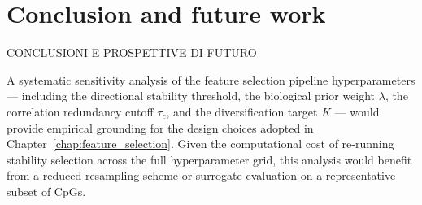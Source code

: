 \chapter{Conclusion and future work}
\label{chap:conclusion_future_work}

CONCLUSIONI E PROSPETTIVE DI FUTURO

A systematic sensitivity analysis of the feature selection 
pipeline hyperparameters — including the directional 
stability threshold, the biological prior weight $\lambda$, 
the correlation redundancy cutoff $\tau_c$, and the 
diversification target $K$ — would provide empirical 
grounding for the design choices adopted in 
Chapter~\ref{chap:feature_selection}. Given the 
computational cost of re-running stability selection 
across the full hyperparameter grid, this analysis 
would benefit from a reduced resampling scheme or 
surrogate evaluation on a representative subset of CpGs.